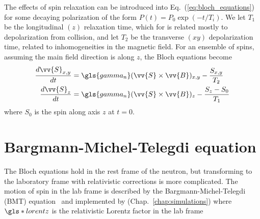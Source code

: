 The effects of spin relaxation can be introduced into Eq.~(\ref{eq:bloch_equations}) for some decaying polarization of the form $P(t)=P_0 \exp(-t/T_i)$. We let $T_1$ be the longitudinal $(z)$ relaxation time, which for \ucn is related mostly to depolarization from collision, and let $T_2$ be the transverse $(xy)$ depolarization time, related to inhomogeneities in the magnetic field. For an ensemble of spins, assuming the main field direction is along $z$, the Bloch equations become
%
\begin{align}
    \frac{d\vv{S}_{x,y}}{dt} &= \gls{gamma_n} (\vv{S} \times \vv{B})_{x,y}-\frac{S_{x,y}}{T_2} \\
    \frac{d\vv{S}_z}{dt} &= \gls{gamma_n} (\vv{S} \times \vv{B})_{z}-\frac{S_z-S_0}{T_1}
\end{align}
%
where $S_0$ is the spin along axis $z$ at $t=0$.


\section{Bargmann-Michel-Telegdi equation}\label{sec:BMT_equations}


The Bloch equations hold in the rest frame of the neutron, but transforming to the laboratory frame with relativistic corrections is more complicated. The motion of spin in the lab frame is described by the Bargmann-Michel-Telegdi (BMT) equation~\cite{bmt_equations} and implemented by \pentrack (Chap.~\ref{chap:simulations})
%
%
where $\gls*{lorentz}$ is the relativistic Lorentz factor in the lab frame